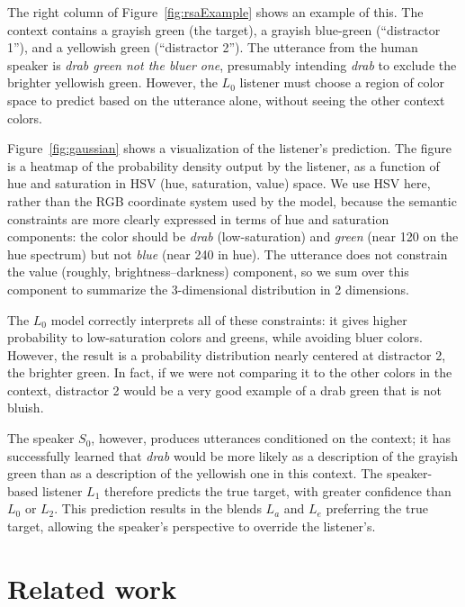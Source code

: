 \documentclass[11pt,letterpaper]{article}
\newcommand{\word}{\textit}
\newcommand{\Listener}{L}
\newcommand{\Speaker}{S}
\renewcommand{\|}{\mid}
\newcommand{\Figref}[1]{Figure~\ref{#1}}
\newcommand{\figref}[1]{Figure~\ref{#1}}
\begin{document}
The right column of \figref{fig:rsaExample} shows an example of this. The context
contains a grayish green (the target), a grayish blue-green (``distractor 1''),
and a yellowish green (``distractor 2'').
The utterance from the human speaker is \word{drab green not the bluer one},
presumably intending \word{drab} to exclude the brighter yellowish green. However,
the $\Listener_0$ listener must choose a region of color space to predict based on
the utterance alone, without seeing the other context colors.

\Figref{fig:gaussian} shows a visualization of the listener's prediction.
The figure is a heatmap of the probability density output by the listener,
as a function of hue and saturation in HSV (hue, saturation, value) space.
We use HSV here, rather than the RGB coordinate system used by the model,
because the semantic constraints are more clearly expressed in terms of
hue and saturation components: the color should be \word{drab} (low-saturation)
and \word{green} (near 120 on the hue spectrum) but not \word{blue}
(near 240 in hue). The utterance does not constrain the value
(roughly, brightness--darkness) component, so we sum over this component to
summarize the 3-dimensional distribution in 2 dimensions.

The $\Listener_0$ model correctly interprets all of these constraints:
it gives higher probability to low-saturation colors and greens, while avoiding
bluer colors. However, the result is a
probability distribution nearly centered at distractor 2, the brighter green.
In fact, if we were not comparing it to the other colors in the context,
distractor 2 would be a very good example of a drab green that is not bluish.

The speaker $\Speaker_0$, however, produces utterances
conditioned on the context; it has successfully learned that \textit{drab}
would be more likely as a description of the grayish green than as a description
of the yellowish one in this context. The speaker-based listener $\Listener_1$
therefore predicts the true target, with greater confidence than $\Listener_0$
or $\Listener_2$. This prediction results in the blends $\Listener_a$ and
$\Listener_e$ preferring the true target, allowing the speaker's perspective
to override the listener's.

\section{Related work}
\end{document}
